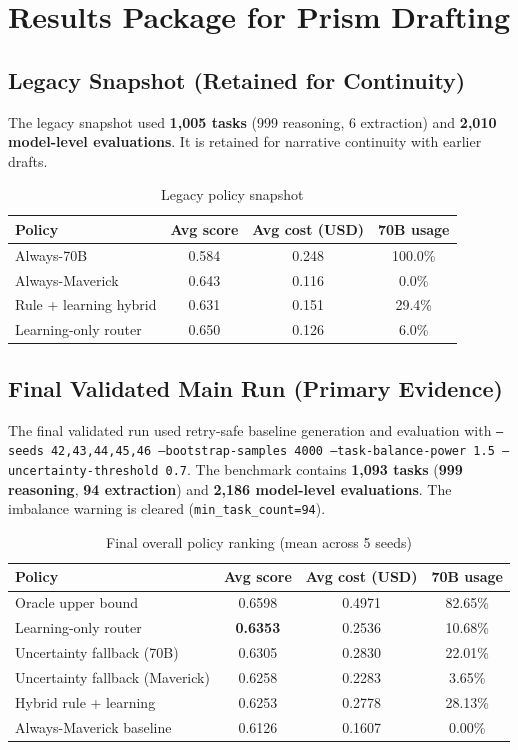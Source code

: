 \section{Results Package for Prism Drafting}
\label{sec:results_package}

\subsection{Legacy Snapshot (Retained for Continuity)}
The legacy snapshot used \textbf{1,005 tasks} (999 reasoning, 6 extraction) and \textbf{2,010 model-level evaluations}.
It is retained for narrative continuity with earlier drafts.

\begin{table}[H]
\centering
\caption{Legacy policy snapshot}
\begin{tabular}{lccc}
\toprule
Policy & Avg score & Avg cost (USD) & 70B usage \\
\midrule
Always-70B & 0.584 & 0.248 & 100.0\% \\
Always-Maverick & 0.643 & 0.116 & 0.0\% \\
Rule + learning hybrid & 0.631 & 0.151 & 29.4\% \\
Learning-only router & 0.650 & 0.126 & 6.0\% \\
\bottomrule
\end{tabular}
\end{table}

\subsection{Final Validated Main Run (Primary Evidence)}
The final validated run used retry-safe baseline generation and evaluation with
\texttt{--seeds 42,43,44,45,46 --bootstrap-samples 4000 --task-balance-power 1.5 --uncertainty-threshold 0.7}.
The benchmark contains \textbf{1,093 tasks} (\textbf{999 reasoning}, \textbf{94 extraction}) and
\textbf{2,186 model-level evaluations}. The imbalance warning is cleared (\texttt{min\_task\_count=94}).

\begin{table}[H]
\centering
\caption{Final overall policy ranking (mean across 5 seeds)}
\begin{tabular}{lccc}
\toprule
Policy & Avg score & Avg cost (USD) & 70B usage \\
\midrule
Oracle upper bound & 0.6598 & 0.4971 & 82.65\% \\
Learning-only router & \textbf{0.6353} & 0.2536 & 10.68\% \\
Uncertainty fallback (70B) & 0.6305 & 0.2830 & 22.01\% \\
Uncertainty fallback (Maverick) & 0.6258 & 0.2283 & 3.65\% \\
Hybrid rule + learning & 0.6253 & 0.2778 & 28.13\% \\
Always-Maverick baseline & 0.6126 & 0.1607 & 0.00\% \\
\bottomrule
\end{tabular}
\end{table}

